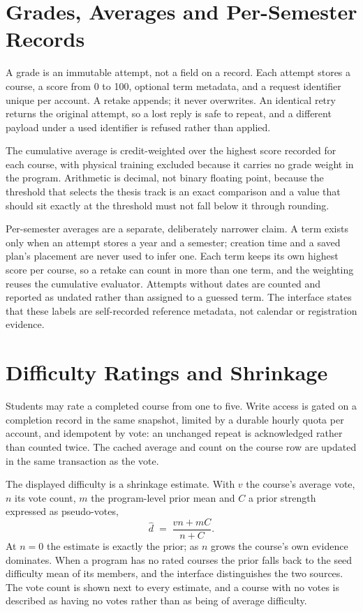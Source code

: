 \section{Grades, Averages and Per-Semester Records}

A grade is an immutable attempt, not a field on a record. Each attempt stores a course, a score from
0 to 100, optional term metadata, and a request identifier unique per account. A retake appends; it
never overwrites. An identical retry returns the original attempt, so a lost reply is safe to
repeat, and a different payload under a used identifier is refused rather than applied.

The cumulative average is credit-weighted over the highest score recorded for each course, with
physical training excluded because it carries no grade weight in the program. Arithmetic is decimal,
not binary floating point, because the threshold that selects the thesis track is an exact
comparison and a value that should sit exactly at the threshold must not fall below it through
rounding.

Per-semester averages are a separate, deliberately narrower claim. A term exists only when an
attempt stores a year and a semester; creation time and a saved plan's placement are never used to
infer one. Each term keeps its own highest score per course, so a retake can count in more than one
term, and the weighting reuses the cumulative evaluator. Attempts without dates are counted and
reported as undated rather than assigned to a guessed term. The interface states that these labels
are self-recorded reference metadata, not calendar or registration evidence.

\section{Difficulty Ratings and Shrinkage}

Students may rate a completed course from one to five. Write access is gated on a completion record
in the same snapshot, limited by a durable hourly quota per account, and idempotent by vote: an
unchanged repeat is acknowledged rather than counted twice. The cached average and count on the
course row are updated in the same transaction as the vote.

The displayed difficulty is a shrinkage estimate. With $v$ the course's average vote, $n$ its vote
count, $m$ the program-level prior mean and $C$ a prior strength expressed as pseudo-votes,
\[
  \hat{d} \;=\; \frac{v n + m C}{n + C}.
\]
At $n = 0$ the estimate is exactly the prior; as $n$ grows the course's own evidence dominates. When
a program has no rated courses the prior falls back to the seed difficulty mean of its members, and
the interface distinguishes the two sources. The vote count is shown next to every estimate, and a
course with no votes is described as having no votes rather than as being of average difficulty.

